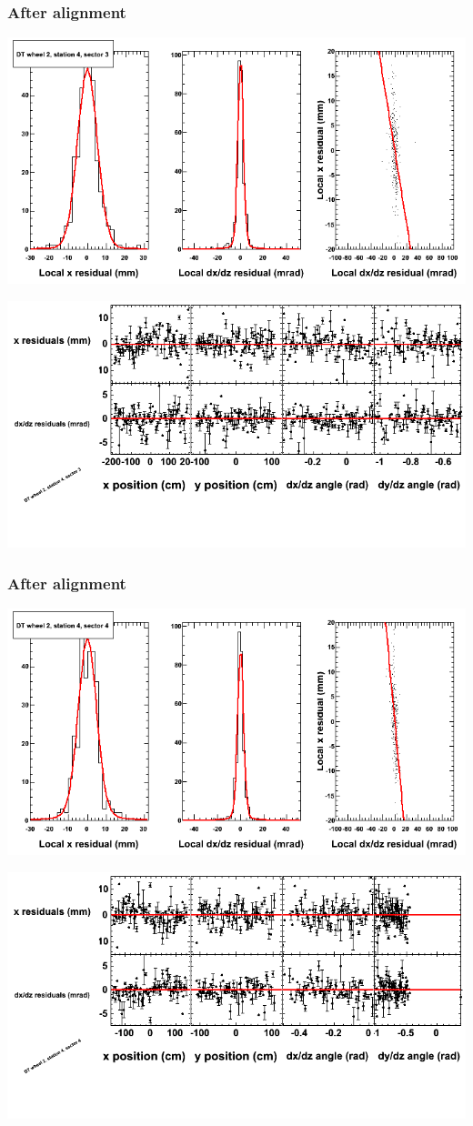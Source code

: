 \documentclass[compress]{beamer}
\begin{document}
\begin{frame}
\frametitle{After alignment}
\includegraphics[width=0.7\linewidth]{NOV4_fitfunctions/MBwhEst4sec03_bellcurves.png}

\includegraphics[width=0.7\linewidth]{NOV4_fitfunctions/MBwhEst4sec03_polynomials.png}
\end{frame}

\begin{frame}
\frametitle{After alignment}
\includegraphics[width=0.7\linewidth]{NOV4_fitfunctions/MBwhEst4sec04_bellcurves.png}

\includegraphics[width=0.7\linewidth]{NOV4_fitfunctions/MBwhEst4sec04_polynomials.png}
\end{frame}
\end{document}
